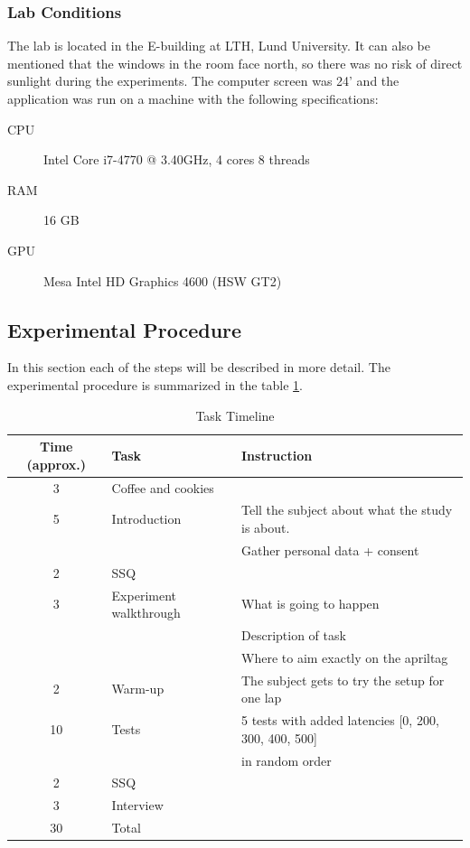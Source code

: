 \documentclass[nofilelist]{cslthse-msc}
\begin{document}
\subsubsection{Lab Conditions}
The lab is located in the E-building at LTH, Lund University. It can also be mentioned that the windows in the room face north, so there was no risk of direct sunlight during the experiments.
The computer screen was 24' and the application was run on a machine with the following specifications:
\begin{description}
   \item[CPU] Intel Core i7-4770 @ 3.40GHz, 4 cores 8 threads
   \item[RAM] 16 GB
   \item[GPU] Mesa Intel HD Graphics 4600 (HSW GT2)
\end{description}

\subsection{Experimental Procedure}
In this section each of the steps will be described in more detail. The experimental procedure is summarized in the table \ref{tab:task-timeline}.

\begin{table}[ht]
   \centering
   \caption{Task Timeline}
   \label{tab:task-timeline}
   \begin{tabular}{|c|l|l|}
   \hline
   \textbf{Time (approx.)} & \textbf{Task} & \textbf{Instruction} \\ \hline
   3 & Coffee and cookies & \\ \hline
   5 & Introduction & Tell the subject about what the study is about. \\
   & & Gather personal data + consent \\ \hline
   2 & SSQ & \\ \hline
   3 & Experiment walkthrough & What is going to happen \\
   & & Description of task \\
   & & Where to aim exactly on the apriltag \\ \hline
   2 & Warm-up & The subject gets to try the setup for one lap \\ \hline
   10 & Tests & 5 tests with added latencies [0, 200, 300, 400, 500] \\ 
   & & in random order \\ \hline
   2 & SSQ & \\ \hline
   3 & Interview & \\ \hline
   30 & Total & \\ \hline
   \end{tabular}
\end{table}
\end{document}
